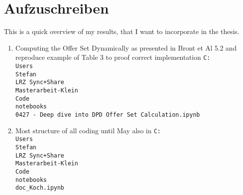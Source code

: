\chapter{Aufzuschreiben}

This is a quick overview of my results, that I want to incorporate in the thesis.

\begin{enumerate}
	\item Computing the Offer Set Dynamically as presented in Bront et Al 5.2 and reproduce example of Table 3 to proof correct implementation \texttt{C:\\Users\\Stefan\\LRZ Sync+Share\\Masterarbeit-Klein\\Code\\notebooks\\0427 - Deep dive into DPD Offer Set Calculation.ipynb}
	\item Most structure of all coding until May also in \texttt{C:\\Users\\Stefan\\LRZ Sync+Share\\Masterarbeit-Klein\\Code\\notebooks\\doc\_Koch.ipynb}
\end{enumerate}